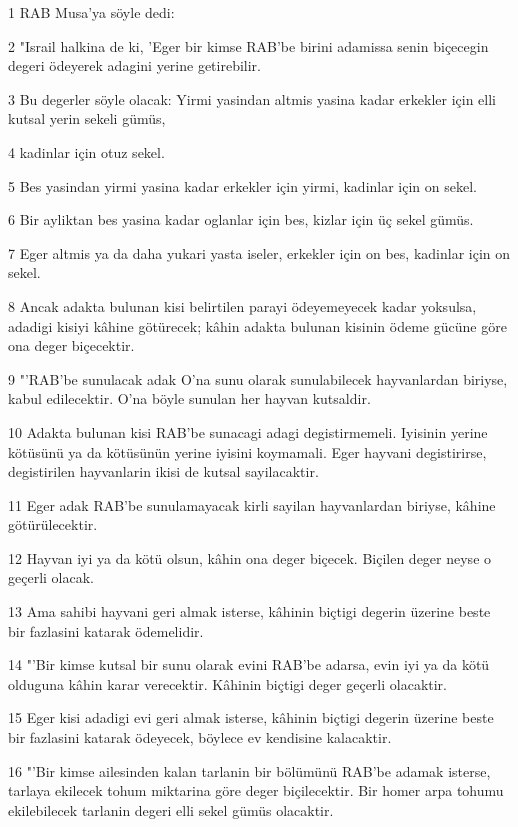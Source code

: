 \par 1 RAB Musa'ya söyle dedi:
\par 2 "Israil halkina de ki, 'Eger bir kimse RAB'be birini adamissa senin biçecegin degeri ödeyerek adagini yerine getirebilir.
\par 3 Bu degerler söyle olacak: Yirmi yasindan altmis yasina kadar erkekler için elli kutsal yerin sekeli gümüs,
\par 4 kadinlar için otuz sekel.
\par 5 Bes yasindan yirmi yasina kadar erkekler için yirmi, kadinlar için on sekel.
\par 6 Bir ayliktan bes yasina kadar oglanlar için bes, kizlar için üç sekel gümüs.
\par 7 Eger altmis ya da daha yukari yasta iseler, erkekler için on bes, kadinlar için on sekel.
\par 8 Ancak adakta bulunan kisi belirtilen parayi ödeyemeyecek kadar yoksulsa, adadigi kisiyi kâhine götürecek; kâhin adakta bulunan kisinin ödeme gücüne göre ona deger biçecektir.
\par 9 "'RAB'be sunulacak adak O'na sunu olarak sunulabilecek hayvanlardan biriyse, kabul edilecektir. O'na böyle sunulan her hayvan kutsaldir.
\par 10 Adakta bulunan kisi RAB'be sunacagi adagi degistirmemeli. Iyisinin yerine kötüsünü ya da kötüsünün yerine iyisini koymamali. Eger hayvani degistirirse, degistirilen hayvanlarin ikisi de kutsal sayilacaktir.
\par 11 Eger adak RAB'be sunulamayacak kirli sayilan hayvanlardan biriyse, kâhine götürülecektir.
\par 12 Hayvan iyi ya da kötü olsun, kâhin ona deger biçecek. Biçilen deger neyse o geçerli olacak.
\par 13 Ama sahibi hayvani geri almak isterse, kâhinin biçtigi degerin üzerine beste bir fazlasini katarak ödemelidir.
\par 14 "'Bir kimse kutsal bir sunu olarak evini RAB'be adarsa, evin iyi ya da kötü olduguna kâhin karar verecektir. Kâhinin biçtigi deger geçerli olacaktir.
\par 15 Eger kisi adadigi evi geri almak isterse, kâhinin biçtigi degerin üzerine beste bir fazlasini katarak ödeyecek, böylece ev kendisine kalacaktir.
\par 16 "'Bir kimse ailesinden kalan tarlanin bir bölümünü RAB'be adamak isterse, tarlaya ekilecek tohum miktarina göre deger biçilecektir. Bir homer arpa tohumu ekilebilecek tarlanin degeri elli sekel gümüs olacaktir.
